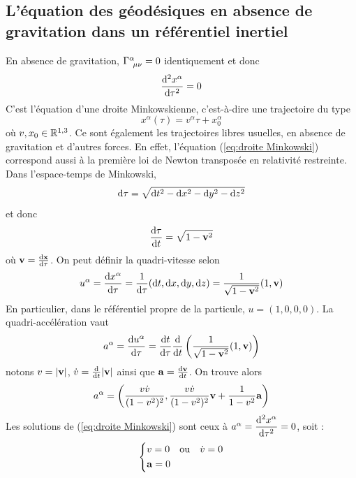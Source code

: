 \subsection{L'équation des géodésiques en absence de gravitation dans un référentiel inertiel}
En absence de gravitation, $\Gamma\indices{^{\alpha}_{\!\mu \nu}} = 0$ identiquement et donc
\begin{equation}
    \frac{\mathrm{d}^2x^{\alpha}}{\mathrm{d}\tau^2} = 0
    \label{eq:droite Minkowski}
\end{equation}
C'est l'équation d'une droite Minkowskienne, c'est-à-dire une trajectoire du type
\begin{equation}
    x^\alpha (\tau) = v^\alpha \tau + x_0^\alpha
\end{equation}
où $v,x_0 \in \mathbb{R}^{1,3}$. Ce sont également les trajectoires libres usuelles, en absence de gravitation et d'autres forces. En effet, l'équation (\ref{eq:droite Minkowski}) correspond aussi à la première loi de Newton transposée en relativité restreinte. Dans l'espace-temps de Minkowski, 
\begin{equation}
    \mathrm{d} \tau = \sqrt{\mathrm{d} t^2 - \mathrm{d} x^2 -\mathrm{d} y^2 - \mathrm{d} z^2}
\end{equation}
et donc 
\begin{equation}
    \frac{\mathrm{d} \tau}{\mathrm{d} t} = \sqrt{1- \bm{\mathrm{v}}^2}
\end{equation}
où $\bm{\mathrm{v}} = \frac{\mathrm{d} \bm{\mathrm{x}}}{\mathrm{d} \tau}$. On peut définir la quadri-vitesse selon
\begin{equation}
    u^\alpha = \frac{\mathrm{d} x^\alpha}{\mathrm{d} \tau} = \frac{1}{\mathrm{d} \tau} (\mathrm{d} t,\mathrm{d} x,\mathrm{d} y,\mathrm{d} z) = \frac{1}{\sqrt{1-\bm{\mathrm{v}}^2}} (1,\bm{\mathrm{v}})
\end{equation}
En particulier, dans le référentiel propre de la particule, $u = (1,0,0,0)$. La quadri-accélération vaut
\begin{equation}
    a^\alpha = \frac{\mathrm{d} u^\alpha}{\mathrm{d} \tau} = \frac{\mathrm{d} t}{\mathrm{d} \tau}\frac{\mathrm{d}}{\mathrm{d} t} \left( \frac{1}{\sqrt{1-\bm{\mathrm{v}}^2}} (1,\bm{\mathrm{v}})\right)
\end{equation}
notons $v=\lvert \bm{\mathrm{v}} \rvert$, $\dot{v} = \frac{\mathrm{d}}{\mathrm{d} t} \lvert \bm{\mathrm{v}} \rvert$ ainsi que $\bm{\mathrm{a}} = \frac{\mathrm{d} \bm{\mathrm{v}}}{\mathrm{d} t}$. On trouve alors
\begin{equation}
    a^\alpha = \left( \frac{v \dot{v}}{(1-v^2)^2}, \frac{v \dot{v}}{(1-v^2)^2} \bm{\mathrm{v}} + \frac{1}{1-v^2} \bm{\mathrm{a}}\right)
\end{equation}
Les solutions de (\ref{eq:droite Minkowski}) sont ceux à $a^\alpha = \dfrac{\mathrm{d}^2 x^\alpha}{\mathrm{d} \tau^2} = 0$, soit :
\begin{align}
    \begin{dcases}
        v = 0 \quad \text{ou} \quad \dot{v} = 0  \\
        \bm{\mathrm{a}} = 0
    \end{dcases}
\end{align}
